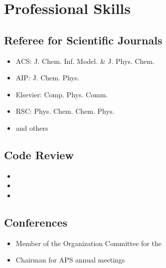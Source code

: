 \documentclass{article}
\begin{document}
\section*{Professional Skills}

\subsection*{Referee for Scientific Journals}

\begin{itemize}
\setlength{\itemsep}{0pt}
\setlength{\parskip}{0pt}
\setlength{\parsep}{0pt}
\item ACS: J. Chem. Inf. Model. \& J. Phys. Chem.
\item AIP: J. Chem. Phys.
\item Elsevier: Comp. Phys. Comm.
\item RSC: Phys. Chem. Chem. Phys.
\item and others
\end{itemize}

\subsection*{Code Review}

\begin{itemize}
\setlength{\itemsep}{0pt}
\setlength{\parskip}{0pt}
\setlength{\parsep}{0pt}
\item {}
\item {}
\item {}
\end{itemize}

\subsection*{Conferences}

\begin{itemize}
\setlength{\itemsep}{0pt}
\setlength{\parskip}{0pt}
\setlength{\parsep}{0pt}
\item Member of the Organization Committee for the 
\item Chairman for APS annual meetings
\end{itemize}
\end{document}

